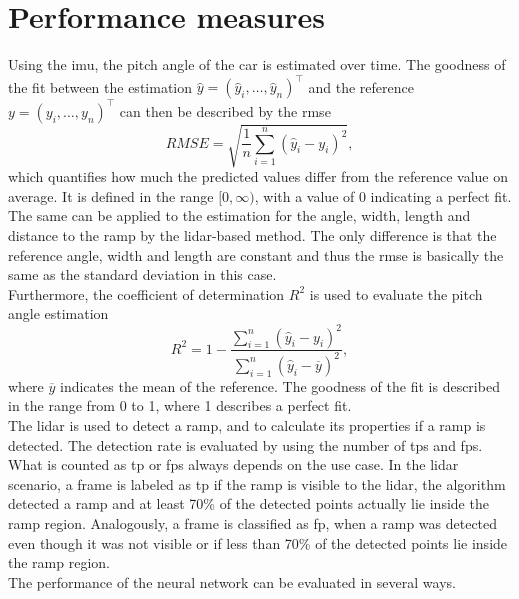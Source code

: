 \section{Performance measures}
\label{sec:performance_measures}
Using the \gls{imu}, the pitch angle of the car is estimated over time.
The goodness of the fit between the estimation $\hat{y} = (\hat{y}_i, \dots, \hat{y}_n)^\intercal$ and the reference $y = (y_i, \dots, y_n)^\intercal$ can then be described by the \gls{rmse}
\begin{equation}
	RMSE = \sqrt{\frac{1}{n}\sum_{i = 1}^n(\hat{y}_i - y_i)^2},
\end{equation}
which quantifies how much the predicted values differ from the reference value on average.
It is defined in the range $[0, \infty)$, with a value of 0 indicating a perfect fit.\\
The same can be applied to the estimation for the angle, width, length and distance to the ramp by the \gls{lidar}-based method.
The only difference is that the reference angle, width and length are constant and thus the \gls{rmse} is basically the same as the standard deviation in this case.\\
Furthermore, the coefficient of determination $R^2$ is used to evaluate the pitch angle estimation
\begin{equation}
	R^2 = 1 - \frac{\sum\limits_{i = 1}^n(\hat{y}_i - y_i)^2}{\sum\limits_{i = 1}^n(\hat{y}_i - \overline{y})^2},
\end{equation}
where $\overline{y}$ indicates the mean of the reference.
The goodness of the fit is described in the range from 0 to 1, where 1 describes a perfect fit.\\
The \gls{lidar} is used to detect a ramp, and to calculate its properties if a ramp is detected.
The detection rate is evaluated by using the number of \glspl{tp} and \glspl{fp}.
What is counted as \gls{tp} or \glspl{fp} always depends on the use case.
In the \gls{lidar} scenario, a frame is labeled as \gls{tp} if the ramp is visible to the \gls{lidar}, the algorithm detected a ramp and at least 70\% of the detected points actually lie inside the ramp region.
Analogously, a frame is classified as \gls{fp}, when a ramp was detected even though it was not visible or if less than 70\% of the detected points lie inside the ramp region.\\
The performance of the neural network can be evaluated in several ways.
